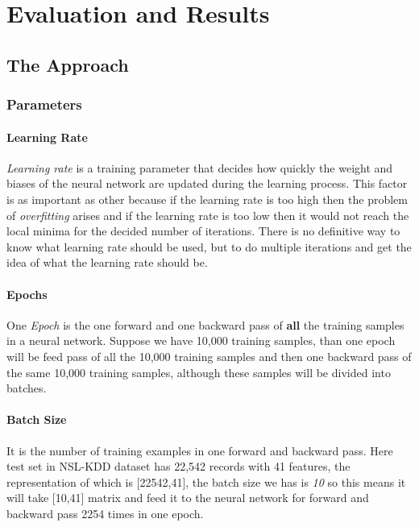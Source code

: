 \documentclass[12pt, a4paper]{report}
\begin{document}
\chapter{Evaluation and Results}\label{sec:EvaluationAndResults}
\section{The Approach}\label{approach}

\subsection{Parameters}
\subsubsection{Learning Rate}
\textit{Learning rate} is a training parameter that decides how quickly the weight and biases of the neural network are updated during the learning process. This factor is as important as other because if the learning rate is too high then the problem of \textit{overfitting} arises and if the learning rate is too low then it would not reach the local minima for the decided number of iterations. There is no definitive way to know what learning rate should be used, but to do multiple iterations and get the idea of what the learning rate should be.\\

\subsubsection{Epochs}
One \textit{Epoch} is the one forward and one backward pass of \textbf{all} the training samples in a neural network. Suppose we have 10,000 training samples, than one epoch will be feed pass of all the 10,000 training samples and then one backward pass of the same 10,000 training samples, although these samples will be divided into batches.\\

\subsubsection{Batch Size}
It is the number of training examples in one forward and backward pass. Here test set in NSL-KDD dataset has 22,542 records with 41 features, the representation of which is [22542,41], the batch size we has is \textit{10} so this means it will take [10,41] matrix and feed it to the neural network for forward and backward pass 2254 times in one epoch.\\
\end{document}
